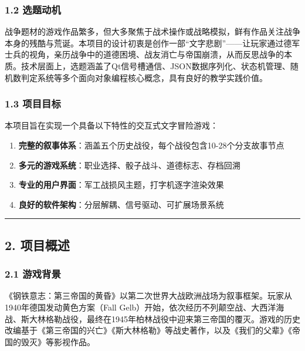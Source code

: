 \hypertarget{ux9009ux9898ux52a8ux673a}{%
\subsubsection{1.2 选题动机}\label{ux9009ux9898ux52a8ux673a}}

战争题材的游戏作品繁多，但大多聚焦于战术操作或战略模拟，鲜有作品关注战争本身的残酷与荒诞。本项目的设计初衷是创作一部``文字悲剧''------让玩家通过德军士兵的视角，亲历战争中的道德困境、战友消亡与帝国崩溃，从而反思战争的本质。技术层面上，选题涵盖了Qt信号槽通信、JSON数据序列化、状态机管理、随机数判定系统等多个面向对象编程核心概念，具有良好的教学实践价值。

\hypertarget{ux9879ux76eeux76eeux6807}{%
\subsubsection{1.3 项目目标}\label{ux9879ux76eeux76eeux6807}}

本项目旨在实现一个具备以下特性的交互式文字冒险游戏：

\begin{enumerate}
\def\labelenumi{\arabic{enumi}.}
\tightlist
\item
  \textbf{完整的叙事体系}：涵盖五个历史战役，每个战役包含10-28个分支故事节点
\item
  \textbf{多元的游戏系统}：职业选择、骰子战斗、道德标志、存档回溯
\item
  \textbf{专业的用户界面}：军工战损风主题，打字机逐字渲染效果
\item
  \textbf{良好的软件架构}：分层解耦、信号驱动、可扩展场景系统
\end{enumerate}

\begin{center}\rule{0.5\linewidth}{0.5pt}\end{center}

\hypertarget{ux9879ux76eeux6982ux8ff0}{%
\subsection{2. 项目概述}\label{ux9879ux76eeux6982ux8ff0}}

\hypertarget{ux6e38ux620fux80ccux666f}{%
\subsubsection{2.1 游戏背景}\label{ux6e38ux620fux80ccux666f}}

《钢铁意志：第三帝国的黄昏》以第二次世界大战欧洲战场为叙事框架。玩家从1940年德国发动黄色方案（Fall
Gelb）开始，依次经历不列颠空战、大西洋海战、斯大林格勒战役，最终在1945年柏林战役中迎来第三帝国的覆灭。游戏的历史改编基于《第三帝国的兴亡》《斯大林格勒》等战史著作，以及《我们的父辈》《帝国的毁灭》等影视作品。

